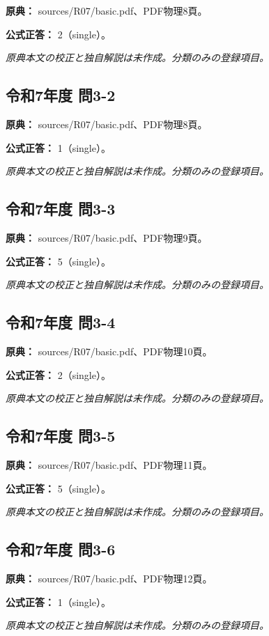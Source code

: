 \noindent\textbf{原典：} sources/R07/basic.pdf、PDF物理8頁。

\textbf{公式正答：} 2（single）。

\par\textit{原典本文の校正と独自解説は未作成。分類のみの登録項目。}

\subsection{令和7年度 問3-2}
\label{q:r07-reg-basic-3-2}

\noindent\textbf{原典：} sources/R07/basic.pdf、PDF物理8頁。

\textbf{公式正答：} 1（single）。

\par\textit{原典本文の校正と独自解説は未作成。分類のみの登録項目。}

\subsection{令和7年度 問3-3}
\label{q:r07-reg-basic-3-3}

\noindent\textbf{原典：} sources/R07/basic.pdf、PDF物理9頁。

\textbf{公式正答：} 5（single）。

\par\textit{原典本文の校正と独自解説は未作成。分類のみの登録項目。}

\subsection{令和7年度 問3-4}
\label{q:r07-reg-basic-3-4}

\noindent\textbf{原典：} sources/R07/basic.pdf、PDF物理10頁。

\textbf{公式正答：} 2（single）。

\par\textit{原典本文の校正と独自解説は未作成。分類のみの登録項目。}

\subsection{令和7年度 問3-5}
\label{q:r07-reg-basic-3-5}

\noindent\textbf{原典：} sources/R07/basic.pdf、PDF物理11頁。

\textbf{公式正答：} 5（single）。

\par\textit{原典本文の校正と独自解説は未作成。分類のみの登録項目。}

\subsection{令和7年度 問3-6}
\label{q:r07-reg-basic-3-6}

\noindent\textbf{原典：} sources/R07/basic.pdf、PDF物理12頁。

\textbf{公式正答：} 1（single）。

\par\textit{原典本文の校正と独自解説は未作成。分類のみの登録項目。}

